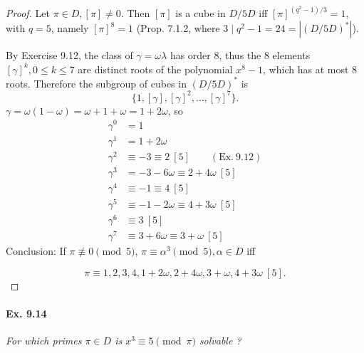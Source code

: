 \documentclass[11pt,a4paper]{article}
\begin{document}
\begin{proof}
Let $\pi \in D, [\pi] \neq 0$. Then $[\pi] $ is a cube in $D/5D$ iff $[\pi]^{(q^2-1)/3} = 1$, with $q = 5$, namely $[\pi]^8 = 1$ (Prop. 7.1.2, where $3 \mid q^2-1 = 24 = |(D/5D)^*| $).

By Exercise 9.12, the class of $\gamma = \omega \lambda$ has order 8, thus the 8 elements $[\gamma]^k, 0 \leq k \leq 7$ are distinct roots of the polynomial $x^8-1$, which has at most 8 roots. Therefore  the subgroup of cubes in $(D/5D)^*$ is
$$\{1 ,[\gamma], [\gamma]^2,\ldots, [\gamma]^7\}.$$
$\gamma=\omega(1-\omega) = \omega+1+\omega = 1 + 2\omega$, so
\begin{align*}
\gamma^0 &= 1\\
\gamma^1 & = 1 + 2\omega\\
\gamma^2 &\equiv -3 \equiv 2\ [5]\qquad (\mathrm{Ex}.\ 9.12)\\
\gamma^3 &= -3 - 6\omega \equiv 2 + 4 \omega \ [5]\\
\gamma^4&\equiv -1 \equiv 4\ [5]\\
\gamma^5 &\equiv -1 - 2 \omega \equiv 4 + 3\omega\ [5]\\
\gamma^6 &\equiv 3 \ [5]\\
\gamma^7 &\equiv 3+6\omega \equiv 3 + \omega \ [5]
\end{align*}
Conclusion: If $\pi \not \equiv 0 \pmod 5$, $\pi \equiv \alpha^3 \pmod 5,\alpha \in D$ iff 

$$\pi \equiv 1,2,3,4,1+2\omega,2+4\omega,3+\omega,4+3\omega\ [5].$$ 
\end{proof}

\paragraph{Ex. 9.14}

{\it For which primes $\pi \in D$ is $x^3 \equiv 5 \pmod \pi$ solvable ?
}
\end{document}
